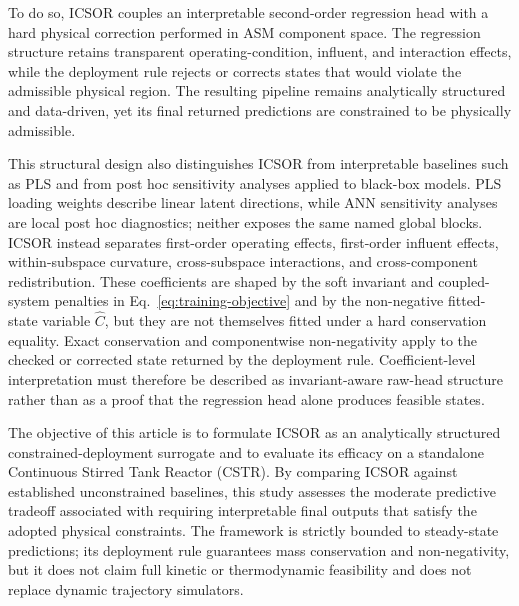 \documentclass[a4paper,fleqn]{cas-sc}
\DeclareRobustCommand{\currentrev}[1]{{\color{currentRevisionBlue}#1}}
\newenvironment{currentrevblock}{\begingroup\color{currentRevisionBlue}}{\endgroup}
\DeclareRobustCommand{\currentrev}[1]{#1}
\newenvironment{currentrevblock}{}{}
\newcommand{\revitem}[2]{#2}
\newenvironment{revblock}{}{}
\begin{document}
\begin{revblock}
\begin{currentrevblock}
To do so, ICSOR couples an interpretable second-order regression head with a hard physical correction performed in ASM component space. The regression structure retains transparent operating-condition, influent, and interaction effects, while the deployment rule rejects or corrects states that would violate the admissible physical region. The resulting pipeline remains analytically structured and data-driven, yet its final returned predictions are constrained to be physically admissible.
\end{currentrevblock}

\revitem{revRtwoOne}{\currentrev{This structural design also distinguishes ICSOR from interpretable baselines such as PLS and from post hoc sensitivity analyses applied to black-box models. PLS loading weights describe linear latent directions, while ANN sensitivity analyses are local post hoc diagnostics; neither exposes the same named global blocks. ICSOR instead separates first-order operating effects, first-order influent effects, within-subspace curvature, cross-subspace interactions, and cross-component redistribution. These coefficients are shaped by the soft invariant and coupled-system penalties in Eq.~\eqref{eq:training-objective} and by the non-negative fitted-state variable $\widehat{C}$, but they are not themselves fitted under a hard conservation equality. Exact conservation and componentwise non-negativity apply to the checked or corrected state returned by the deployment rule. Coefficient-level interpretation must therefore be described as invariant-aware raw-head structure rather than as a proof that the regression head alone produces feasible states.}}

\begin{currentrevblock}
The objective of this article is to formulate ICSOR as an analytically structured constrained-deployment surrogate and to evaluate its efficacy on a standalone Continuous Stirred Tank Reactor (CSTR). By comparing ICSOR against established unconstrained baselines, this study assesses the moderate predictive tradeoff associated with requiring interpretable final outputs that satisfy the adopted physical constraints. The framework is strictly bounded to steady-state predictions; its deployment rule guarantees mass conservation and non-negativity, but it does not claim full kinetic or thermodynamic feasibility and does not replace dynamic trajectory simulators.
\end{currentrevblock}
\end{revblock}
\end{document}
